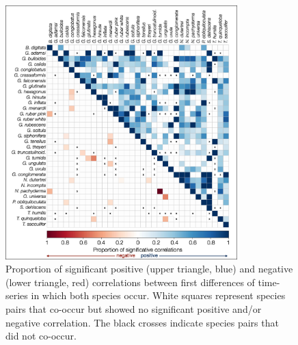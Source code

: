 \begin{figure}
\centering
\includegraphics[width=0.8\textwidth]{traps_correlation_low.png}
\caption{\label{fig:corr_prop} Proportion of significant positive (upper triangle, blue) and negative (lower triangle, red) correlations between first differences of time-series in which both species occur. White squares represent species pairs that co-occur but showed no significant positive and/or negative correlation. The black crosses indicate species pairs that did not co-occur.}
\end{figure}
